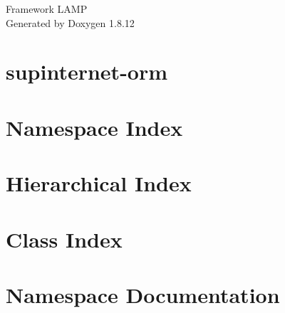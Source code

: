 \documentclass[twoside]{book}
\newcommand{\+}{\discretionary{\mbox{\scriptsize$\hookleftarrow$}}{}{}}
\newcommand{\clearemptydoublepage}{%
  \newpage{\pagestyle{empty}\cleardoublepage}%
}
\begin{document}
\hypersetup{pageanchor=false,
             bookmarksnumbered=true,
             pdfencoding=unicode
            }
\begin{titlepage}
\vspace*{7cm}
\begin{center}%
{\Large Framework L\+A\+MP }\\
\vspace*{1cm}
{\large Generated by Doxygen 1.8.12}\\
\end{center}
\end{titlepage}
\clearemptydoublepage
{}
\tableofcontents
\clearemptydoublepage
{}
\hypersetup{pageanchor=true}

\chapter{supinternet-\/orm}
\label{md_app_orm_README}
\hypertarget{md_app_orm_README}{}

\chapter{Namespace Index}

\chapter{Hierarchical Index}

\chapter{Class Index}

\chapter{Namespace Documentation}














\end{document}
